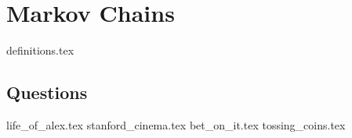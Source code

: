 \documentclass{exam}
\begin{document}
\section{Markov Chains}
{definitions.tex}
\subsection{Questions}
\begin{questions}
{life_of_alex.tex}
{stanford_cinema.tex}
{bet_on_it.tex}
{tossing_coins.tex}
\end{questions}
\end{document}
